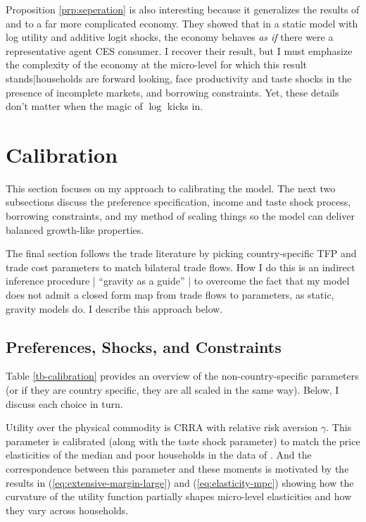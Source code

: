 \documentclass[12pt,pdftex]{article}
\begin{document}
\begin{onehalfspacing}
Proposition \ref{prp:seperation} is also interesting because it generalizes the results of \citet{anderson1987ces} and \citet{anderson1992discrete} to a far more complicated economy. They showed that in a static model with log utility and additive logit shocks, the economy behaves \emph{as if} there were a representative agent CES consumer. I recover their result, but I must emphasize the complexity of the economy at the micro-level for which this result stands|households are forward looking, face productivity and taste shocks in the presence of incomplete markets, and borrowing constraints. Yet, these details don't matter when the magic of $\log$ kicks in.

\section{Calibration}

This section focuses on my approach to calibrating the model. The next two subsections discuss the preference specification, income and taste shock process, borrowing constraints, and my method of scaling things so the model can deliver balanced growth-like properties.

The final section follows the trade literature by picking country-specific TFP and trade cost parameters to match bilateral trade flows. How I do this is an indirect inference procedure | ``gravity as a guide'' | to overcome the fact that my model does not admit a closed form map from trade flows to parameters, as static, gravity models do. I describe this approach below.

\subsection{Preferences, Shocks, and Constraints}

Table \ref{tb-calibration} provides an overview of the non-country-specific parameters (or if they are country specific, they are all scaled in the same way). Below, I discuss each choice in turn.

Utility over the physical commodity is CRRA with relative risk aversion $\gamma$. This parameter is calibrated (along with the taste shock parameter) to match the price elasticities of the median and poor households in the data of \citet{auer2022unequal}. And the correspondence between this parameter and these moments is motivated by the results in (\ref{eq:extensive-margin-large}) and (\ref{eq:elasticity-mpc}) showing how the curvature of the utility function partially shapes micro-level elasticities and how they vary across households.


\end{onehalfspacing}
\end{document}
